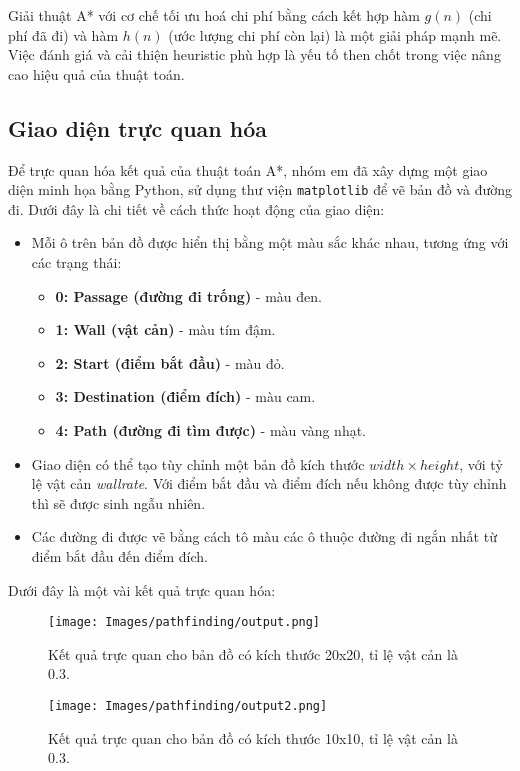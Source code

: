 Giải thuật A* với cơ chế tối ưu hoá chi phí bằng cách kết hợp hàm $g(n)$ (chi phí đã đi) và hàm $h(n)$ (ước lượng chi phí còn lại) là một giải pháp mạnh mẽ. Việc đánh giá và cải thiện heuristic phù hợp là yếu tố then chốt trong việc nâng cao hiệu quả của thuật toán.

\subsection{Giao diện trực quan hóa}
Để trực quan hóa kết quả của thuật toán A*, nhóm em đã xây dựng một giao diện minh họa bằng Python, sử dụng thư viện \texttt{matplotlib} để vẽ bản đồ và đường đi. Dưới đây là chi tiết về cách thức hoạt động của giao diện:

\begin{itemize}
    \item Mỗi ô trên bản đồ được hiển thị bằng một màu sắc khác nhau, tương ứng với các trạng thái:
    \begin{itemize}
        \item \textbf{0: Passage (đường đi trống)} - màu đen.
        \item \textbf{1: Wall (vật cản)} - màu tím đậm.
        \item \textbf{2: Start (điểm bắt đầu)} - màu đỏ.
        \item \textbf{3: Destination (điểm đích)} - màu cam.
        \item \textbf{4: Path (đường đi tìm được)} - màu vàng nhạt.
    \end{itemize}
    \item Giao diện có thể tạo tùy chỉnh một bản đồ kích thước \( width \times height \), với tỷ lệ vật cản \textit{wallrate}. Với điểm bắt đầu và điểm đích nếu không được tùy chỉnh thì sẽ được sinh ngẫu nhiên.
    \item Các đường đi được vẽ bằng cách tô màu các ô thuộc đường đi ngắn nhất từ điểm bắt đầu đến điểm đích.
\end{itemize}



\newpage
Dưới đây là một vài kết quả trực quan hóa:

\begin{figure}[H]
    \centering
    \texttt{[image: Images/pathfinding/output.png]}
    \caption{Kết quả trực quan cho bản đồ có kích thước 20x20, tỉ lệ vật cản là 0.3.}
    \label{fig:visualization1}
\end{figure}

\begin{figure}[H]
    \centering
    \texttt{[image: Images/pathfinding/output2.png]}
    \caption{Kết quả trực quan cho bản đồ có kích thước 10x10, tỉ lệ vật cản là 0.3.}
    \label{fig:visualization2}
\end{figure}
\newpage
